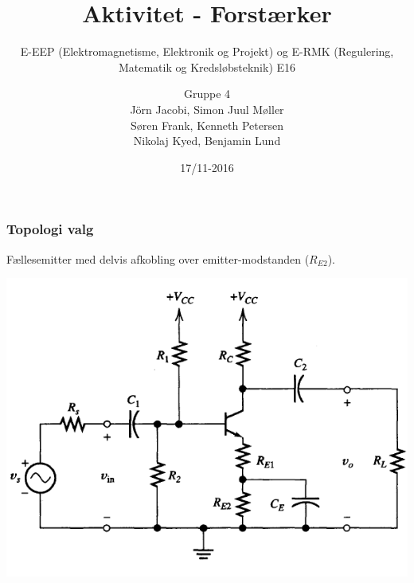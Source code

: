 \documentclass{beamer}
\begin{document}
\title[Aktivitet - Forstærker]
{Aktivitet - Forstærker}
\subtitle{E-EEP (Elektromagnetisme, Elektronik og Projekt) og E-RMK (Regulering, Matematik og Kredsløbsteknik) E16}
\author[Gruppe 4] %
{Gruppe 4\\ 
J\"{o}rn Jacobi, Simon Juul M\o ller\\ S\o ren Frank, Kenneth Petersen\\ Nikolaj Kyed, Benjamin Lund}
\date{17/11-2016}

\frame{\titlepage}


\begin{frame}
	\frametitle{Topologi valg}
	Fællesemitter med delvis afkobling over emitter-modstanden ($R_{E2}$).
	\begin{center}
		\includegraphics[width=0.8\linewidth]{images/trans_topo1.png}
	\end{center}
\end{frame}
\end{document}
